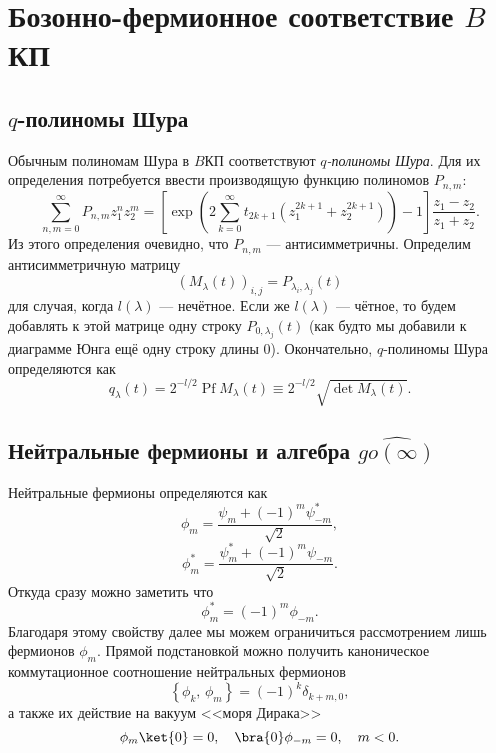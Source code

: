 \documentclass[a4paper,14pt]{extarticle}
\numberwithin{equation}{section}
\begin{document}
\section{Бозонно-фермионное соответствие $B$КП}
\subsection{$q$-полиномы Шура}
Обычным полиномам Шура в $B$КП соответствуют \emph{$q$-полиномы Шура}.
Для их определения потребуется ввести производящую функцию
полиномов $P_{n,m}$:
\[
\sum_{n,m=0}^{\infty} P_{n,m} z_1^n z_2^m=
\left[ \exp \left( 
2 \sum_{k=0}^{\infty} t_{2k+1}\left( 
z_1^{2k+1}+z_2^{2k+1}\right) \right) -1 \right] \frac{z_1-z_2}{z_1+z_2}
.\] 
Из этого определения очевидно, что $P_{n,m}$ --- антисимметричны.
Определим антисимметричную матрицу
\[
	\left( M_\lambda(t) \right) _{i,j}=P_{\lambda_i,\lambda_j}(t)
\]
для случая, когда $l(\lambda)$ --- нечётное. Если же  $l(\lambda)$ 
--- чётное, то будем добавлять к этой матрице
одну строку $P_{0,\lambda_j}(t)$ (как будто мы добавили к диаграмме Юнга ещё одну строку длины 0). Окончательно,
$q$-полиномы Шура определяются как
\[
q_\lambda(t)= 2^{-l /2} \operatorname{Pf} M_\lambda (t)  \equiv 2^{-l /2} \sqrt{\det M_\lambda (t)} 
.\] 
\subsection{Нейтральные фермионы и алгебра $\widehat{go(\infty)}$}
Нейтральные фермионы определяются как
\begin{equation}
	\phi_m= \frac{\psi_m +\left( -1 \right) ^m \psi^*_{-m}}{\sqrt{2} }
,\end{equation} 
\begin{equation}
	\phi_m^*= \frac{\psi_m^* +\left( -1 \right) ^m \psi_{-m}}{\sqrt{2} }
.\end{equation}
Откуда сразу можно заметить что 
\begin{equation}
	\phi_m^*= (-1)^m \phi_{-m}
.\end{equation} 
Благодаря этому свойству далее мы можем ограничиться
рассмотрением лишь фермионов $ \phi_m  $.
Прямой подстановкой можно получить каноническое коммутационное соотношение нейтральных
фермионов
\begin{equation}
	\left\{ \phi_k,\,\phi_m \right\} =\left( -1 \right) ^k
	\delta_{k+m,0}
,\end{equation} 
а также их действие на вакуум <<моря Дирака>>
\begin{equation}
\phi_m \ket{0}=0,\quad
\bra{0}\phi_{-m} =0,\quad m<0.\end{equation} 
\end{document}
